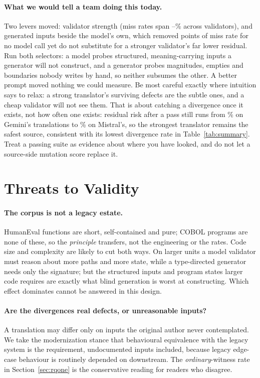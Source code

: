 \documentclass[sigconf]{acmart}
\begin{document}
\paragraph{What we would tell a team doing this today.}
Two levers moved: validator strength (miss rates span \VMissGemini--\VMissMistral\% across
validators), and \KParity{} generated inputs beside the model's own, which removed \ComboGain{}
points of miss rate for no model call yet do not substitute for a stronger validator's far
lower residual. Run both selectors: a model probes structured, meaning-carrying inputs a
generator will not construct, and a generator probes magnitudes, empties and boundaries nobody
writes by hand, so neither subsumes the other. A better prompt moved nothing we could measure. Be most careful exactly where
intuition says to relax: a strong translator's surviving defects are the subtle ones, and a
cheap validator will not see them. That is about catching a divergence once it exists, not how
often one exists: residual risk after a pass still runs from \EscapeTransGemini\% on Gemini's
translations to \EscapeTransMistral\% on Mistral's, so the strongest translator remains the
safest source, consistent with its lowest divergence rate in Table~\ref{tab:summary}. Treat a
passing suite as evidence about where you have looked, and do not let a source-side mutation
score replace it.

\section{Threats to Validity}

\paragraph{The corpus is not a legacy estate.}
HumanEval functions are short, self-contained and pure; COBOL programs are none of these, so
the \emph{principle} transfers, not the engineering or the rates. Code size and complexity are
likely to cut both ways. On larger units a model validator must reason about more paths and
more state, while a type-directed generator needs only the signature; but the structured inputs
and program states larger code requires are exactly what blind generation is worst at
constructing. Which effect dominates cannot be answered in this design.

\paragraph{Are the divergences real defects, or unreasonable inputs?}
A translation may differ only on inputs the original author never contemplated. We take the
modernization stance that behavioural equivalence with the legacy system is the requirement,
undocumented inputs included, because legacy edge-case behaviour is routinely depended on
downstream. The \emph{ordinary}-witness rate in Section~\ref{sec:rqone} is the conservative
reading for readers who disagree.
\end{document}
